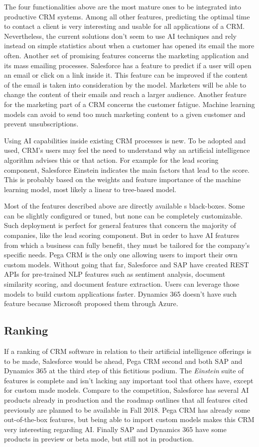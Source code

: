 The four functionalities above are the most mature ones to be integrated into productive CRM systems. Among all other features, predicting the optimal time to contact a client is very interesting and usable for all applications of a CRM. Nevertheless, the current solutions don't seem to use AI techniques and rely instead on simple statistics about when a customer has opened its email the more often. Another set of promising features concerns the marketing application and its mass emailing processes. Salesforce has a feature to predict if a user will open an email or click on a link inside it. This feature can be improved if the content of the email is taken into consideration by the model. Marketers will be able to change the content of their emails and reach a larger audience. Another feature for the marketing part of a CRM concerns the customer fatigue. Machine learning models can avoid to send too much marketing content to a given customer and prevent unsubscriptions.

Using AI capabilities inside existing CRM processes is new. To be adopted and used, CRM's users may feel the need to understand why an artificial intelligence algorithm advises this or that action. For example for the lead scoring component, Salesforce Einstein indicates the main factors that lead to the score. This is probably based on the weights and feature importance of the machine learning model, most likely a linear to tree-based model.

Most of the features described above are directly available s black-boxes. Some can be slightly configured or tuned, but none can be completely customizable. Such deployment is perfect for general features that concern the majority of companies, like the lead scoring component. But in order to have AI features from which a business can fully benefit, they must be tailored for the company's specific needs. Pega CRM is the only one allowing users to import their own custom models. Without going that far, Salesforce and SAP have created REST APIs for pre-trained NLP features such as sentiment analysis, document similarity scoring, and document feature extraction. Users can leverage those models to build custom applications faster. Dynamics 365 doesn't have such feature because Microsoft proposed them through Azure.


\subsection{Ranking}
If a ranking of CRM software in relation to their artificial intelligence offerings is to be made, Salesforce would be ahead, Pega CRM second and both SAP and Dynamics 365 at the third step of this fictitious podium. The \textit{Einstein} suite of features is complete and isn't lacking any important tool that others have, except for custom made models. Compare to the competition, Salesforce has several AI products already in production and the roadmap outlines that all features cited previously are planned to be available in Fall 2018. Pega CRM has already some out-of-the-box features, but being able to import custom models makes this CRM very interesting regarding AI. Finally SAP and Dynamics 365 have some products in preview or beta mode, but still not in production. 

